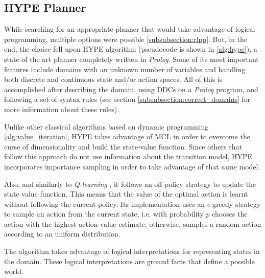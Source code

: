 \subsection{\gls{HYPE} Planner}

While searching for an appropriate planner that would take advantage of logical
programming, multiple options were possible \ref{subsubsection:rlpp}.
But, in the end, the choice fell upon \gls{HYPE} algorithm
\cite{nitti2015planning} (pseudocode is shown in \ref{alg:hype}), a state of the
art planner completely written in
\textit{Prolog}. Some of its most important features include domains
with an unknown number of variables and handling both discrete and continuous state
and/or action spaces. All of this is accomplished after describing the domain,
using \glspl{DDC} on a \textit{Prolog} program, and following a set of syntax
rules (see section \ref{subsubsection:correct_domains} for more information about
these rules).

Unlike other classical algorithms based on dynamic programming
\ref{alg:value_iteration}, \gls{HYPE} takes advantage of \gls{MCL} in order to
overcome the curse of dimensionality and build the state-value function.
Since others that follow this approach do not use information about the
transition model, \gls{HYPE} incorporates importance sampling in order to take
advantage of that same model.

Also, and similarly to \textit{Q-learning} \cite{Sutton1998}, it follows an
off-policy strategy to update the state value function. This means that the
value of the optimal action is learnt without following the current policy.
Its implementation uses an $\epsilon$-greedy strategy to sample an action
from the current state, i.e. with probability $p$ chooses the action with the
highest action-value estimate, otherwise, samples a random action according to an
uniform distribution.

The algorithm takes advantage of logical interpretations for representing
states in the domain. These logical interpretations are ground facts that
define a possible world.

